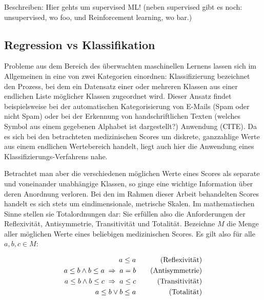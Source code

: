 Beschreiben: Hier gehts um supervised ML! (neben supervised gibt es noch: unsupervised, wo foo, und Reinforcement learning, wo bar.)

\subsection{Regression vs Klassifikation}\label{section:regrvsclf}
Probleme aus dem Bereich des überwachten maschinellen Lernens lassen sich im Allgemeinen in eine von zwei Kategorien einordnen:
Klassifizierung bezeichnet den Prozess, bei dem ein Datensatz einer oder mehreren Klassen aus einer endlichen Liste möglicher Klassen zugeordnet wird. Dieser Ansatz findet beispielsweise bei der automatischen Kategorisierung von E-Mails (Spam oder nicht Spam) oder bei der Erkennung von handschriftlichen Texten (welches Symbol aus einem gegebenen Alphabet ist dargestellt?) Anwendung (CITE). 
Da es sich bei den betrachteten medizinischen Scores um diskrete, ganzzahlige Werte aus einem endlichen Wertebereich handelt, liegt auch hier die Anwendung eines Klassifizierungs-Verfahrens nahe.

Betrachtet man aber die verschiedenen möglichen Werte eines Scores als separate und voneinander unabhängige Klassen, so ginge eine wichtige Information über deren Anordnung verloren. Bei den im Rahmen dieser Arbeit behandelten Scores handelt es sich stets um eindimensionale, metrische Skalen. Im mathematischen Sinne stellen sie Totalordnungen dar: Sie erfüllen also die Anforderungen der Reflexivität, Antisymmetrie, Transitivität und Totalität. Bezeichne $M$ die Menge aller möglichen Werte eines beliebigen medizinischen Scores. Es gilt also für alle $a,b,c \in M$:

\begin{equation*}
    \centering
    \begin{aligned}[c]
        a \leq a\\
        a \leq b \land b \leq a \; \Rightarrow \; a=b\\
        a \leq b \land b \leq c \; \Rightarrow \; a \leq c\\
        a \leq b \lor b \leq a
    \end{aligned}
    \qquad
    \begin{aligned}[c]
        \text{(Reflexivität)}\\
        \text{(Antisymmetrie)}\\
        \text{(Transitivität)}\\
        \text{(Totalität)}
    \end{aligned}
\end{equation*}

